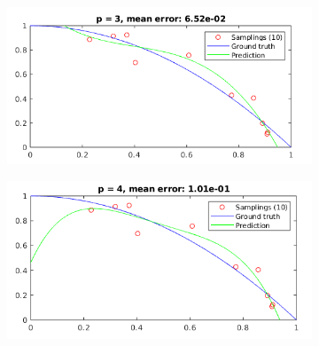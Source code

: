 \documentclass[12pt]{article}
\begin{document}
\begin{figure}[H]
  \centering
  \begin{subfigure}{0.45\textwidth}
    \includegraphics[width=\textwidth]{plots/regression/p_eq_3.png}
  \end{subfigure}
  \begin{subfigure}{0.45\textwidth}
    \includegraphics[width=\textwidth]{plots/regression/p_eq_4.png}
  \end{subfigure}
\end{figure}
\end{document}
